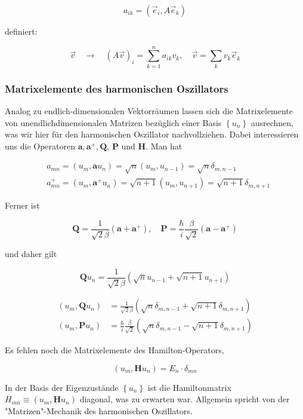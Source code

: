 \documentclass[10pt, letterpaper]{article}
\begin{document}
$$
a_{i k}=\left(\vec{e}_{i}, A \vec{e}_{k}\right)
$$

definiert:

$$
\vec{v} \quad \rightarrow \quad(A \vec{v})_{i}=\sum_{k=1}^{n} a_{i k} v_{k}, \quad \vec{v}=\sum_{k} v_{k} \vec{e}_{k}
$$

\subsubsection*{Matrixelemente des harmonischen Oszillators}
Analog zu endlich-dimensionalen Vektorräumen lassen sich die Matrixelemente von unendlichdimensionalen Matrizen bezüglich einer Basis $\left\{u_{n}\right\}$ ausrechnen, was wir hier für den harmonischen Oszillator nachvollziehen. Dabei interessieren uns die Operatoren $\mathbf{a}, \mathbf{a}^{+}, \mathbf{Q}$, $\mathbf{P}$ und $\mathbf{H}$. Man hat

$$
\begin{aligned}
& a_{m n}=\left(u_{m}, \mathbf{a} u_{n}\right)=\sqrt{n}\left(u_{m}, u_{n-1}\right)=\sqrt{n} \delta_{m, n-1} \\
& a_{m n}^{+}=\left(u_{m}, \mathbf{a}^{+} u_{n}\right)=\sqrt{n+1}\left(u_{m}, u_{n+1}\right)=\sqrt{n+1} \delta_{m, n+1}
\end{aligned}
$$

Ferner ist

$$
\mathbf{Q}=\frac{1}{\sqrt{2} \beta}\left(\mathbf{a}+\mathbf{a}^{+}\right), \quad \mathbf{P}=\frac{\hbar}{i} \frac{\beta}{\sqrt{2}}\left(\mathbf{a}-\mathbf{a}^{+}\right)
$$

und daher gilt

$$
\mathbf{Q} u_{n}=\frac{1}{\sqrt{2} \beta}\left(\sqrt{n} u_{n-1}+\sqrt{n+1} u_{n+1}\right)
$$

$$
\begin{aligned}
\left(u_{m}, \mathbf{Q} u_{n}\right) & =\frac{1}{\sqrt{2} \beta}\left(\sqrt{n} \delta_{m, n-1}+\sqrt{n+1} \delta_{m, n+1}\right) \\
\left(u_{m}, \mathbf{P} u_{n}\right) & =\frac{\hbar}{i} \frac{\beta}{\sqrt{2}}\left(\sqrt{n} \delta_{m, n-1}-\sqrt{n+1} \delta_{m, n+1}\right)
\end{aligned}
$$

Es fehlen noch die Matrixelemente des Hamilton-Operators,

$$
\left(u_{m}, \mathbf{H} u_{n}\right)=E_{n} \cdot \delta_{m n}
$$

In der Basis der Eigenzustände $\left\{u_{n}\right\}$ ist die Hamiltonmatrix $H_{m n} \equiv\left(u_{m}, \mathbf{H} u_{n}\right)$ diagonal, was zu erwarten war. Allgemein spricht von der "Matrizen"-Mechanik des harmonischen Oszillators.
\end{document}
